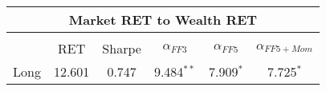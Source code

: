 \begin{table}[!htbp]
\begin{adjustbox}{width=\textwidth,max height=.43\totalheight}
%		
%		
%		
%		
	\end{adjustbox}
	\begin{adjustbox}{width=\textwidth,max height=.43\totalheight}
	\begin{tabular}{lccccc}
		\multicolumn{6}{c}{Market RET to Wealth RET}\\
		\hline\\[-1.8ex]
		& RET & Sharpe & $\alpha_{FF3}$ & $\alpha_{FF5}$ & $\alpha_{FF5+Mom}$ \\
		\cline{2-6}
		Long & 12.601 & 0.747 & 9.484$^{**}$ & 7.909$^{*}$ & 7.725$^{*}$ \\

\end{tabular}
\end{adjustbox}
\end{table}
